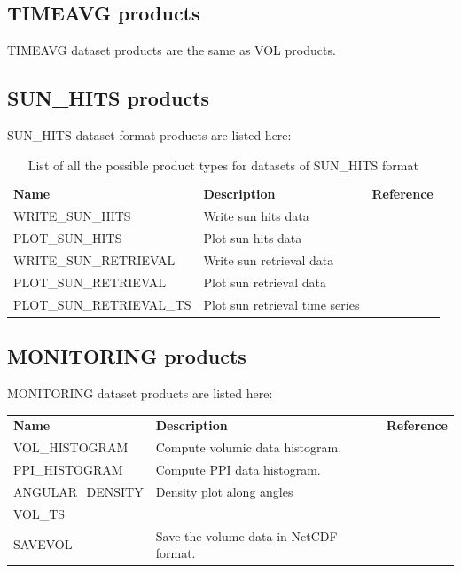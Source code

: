 \documentclass[a4paper,11pt,pdftex,twoside]{scrartcl}
\renewcommand{\bf}{\normalfont \bfseries}
\begin{document}
{{{\subsection{TIMEAVG products}
TIMEAVG dataset products are the same as VOL products.

\subsection{SUN\_HITS products}
SUN\_HITS dataset format products are listed here:



\begin{table}[H]
\begin{tabularx}{\textwidth}{lXl}
{\bf Name} & {\bf Description} & {\bf Reference}\\
WRITE\_SUN\_HITS & Write sun hits data &  \\
PLOT\_SUN\_HITS & Plot sun hits data &  \\
WRITE\_SUN\_RETRIEVAL & Write sun retrieval data &  \\
PLOT\_SUN\_RETRIEVAL & Plot sun retrieval data &  \\
PLOT\_SUN\_RETRIEVAL\_TS & Plot sun retrieval time series &  \\

\end{tabularx}
\caption{List of all the possible product types for datasets of SUN\_HITS format}
\label{tab_products_SUN_HITS}
\end{table}

\subsection{MONITORING products}
MONITORING dataset products are listed here:

\begin{table}[H]
\begin{tabularx}{\textwidth}{lXl}
{\bf Name} & {\bf Description} & {\bf Reference}\\
VOL\_HISTOGRAM & Compute volumic data histogram. &  \\
PPI\_HISTOGRAM & Compute PPI data histogram. &  \\
ANGULAR\_DENSITY & Density plot along angles &  \\
VOL\_TS & & \\
SAVEVOL & Save the volume data in NetCDF format. & \\


\end{tabularx}
\end{table}}}}
\end{document}
